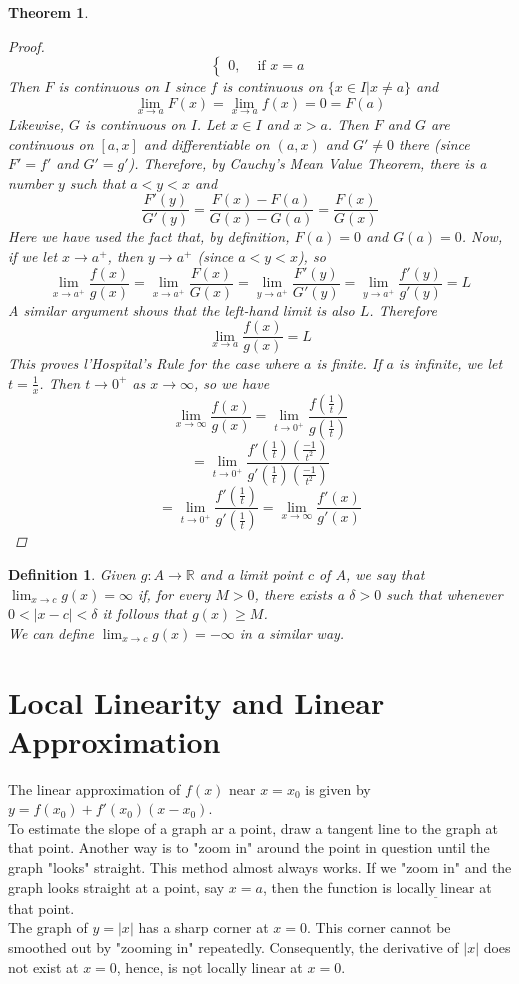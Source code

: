 \documentclass[10pt]{report}
\newtheorem{thm2}{Theorem}[section]
\newtheorem{def2}{Definition}[section]
\begin{document}
\begin{thm2}
\begin{proof}
$$\begin{cases}
0, & \text{ if } x=a
\end{cases}$$
Then $F$ is continuous on $I$ since $f$ is continuous on $\{x\in I|x\neq a\}$ and
$$\lim_{x\to a}F(x)=\lim_{x\to a}f(x)=0=F(a)$$
Likewise, $G$ is continuous on $I$. Let $x\in I$ and $x>a$. Then $F$ and $G$ are continuous on $[a,x]$ and differentiable on $(a,x)$ and $G'\neq 0$ there (since $F'=f'$ and $G' = g'$). Therefore, by Cauchy's Mean Value Theorem, there is a number $y$ such that $a<y<x$ and 
$$\frac{F'(y)}{G'(y)}=\frac{F(x)-F(a)}{G(x)-G(a)}=\frac{F(x)}{G(x)}$$
Here we have used the fact that, by definition, $F(a) =0$ and $G(a)=0$. Now, if we let $x\to a^+$, then $y\to a^+$ (since $a<y<x$), so
$$\lim_{x\to a^+}\frac{f(x)}{g(x)}=\lim_{x\to a^+}\frac{F(x)}{G(x)}=\lim_{y\to a^+}\frac{F'(y)}{G'(y)}=\lim_{y\to a^+}\frac{f'(y)}{g'(y)}=L$$
A similar argument shows that the left-hand limit is also $L$. Therefore
$$\lim_{x\to a}\frac{f(x)}{g(x)}=L$$
This proves l'Hospital's Rule for the case where $a$ is finite. If $a$ is infinite, we let $t=\frac{1}{x}$. Then $t\to 0^+$ as $x\to \infty$, so we have
$$\lim_{x\to \infty}\frac{f(x)}{g(x)}=\lim_{t\to 0^+}\frac{f(\frac{1}{t})}{g(\frac{1}{t})}$$
$$=\lim_{t\to 0^+}\frac{f'(\frac{1}{t})(\frac{-1}{t^2})}{g'(\frac{1}{t})(\frac{-1}{t^2})}$$
$$=\lim_{t\to 0^+}\frac{f'(\frac{1}{t})}{g'(\frac{1}{t})}=\lim_{x\to \infty}\frac{f'(x)}{g'(x)}$$
\end{proof}
\end{thm2}
\begin{def2}
Given $g:A\to\mathbb{R}$ and a limit point $c$ of $A$, we say that $\lim_{x\to c}g(x) = \infty$ if, for every $M>0$, there exists a $\delta >0$ such that whenever $0<|x-c|<\delta$ it follows that $g(x) \geq M$.\\We can define $\lim_{x\to c}g(x)=-\infty$ in a similar way.
\end{def2}
\section{Local Linearity and Linear Approximation}
The linear approximation of $f(x)$ near $x=x_0$ is given by $y=f(x_0)+f'(x_0)(x-x_0)$.\\
To estimate the slope of a graph ar a point, draw a tangent line to the graph at that point. Another way is to "zoom in" around the point in question until the graph "looks" straight. This method almost always works. If we "zoom in" and the graph looks straight at a point, say $x=a$, then the function is $\underline{\text{locally linear}}$ at that point.\\
The graph of $y=|x|$ has a sharp corner at $x=0$. This corner cannot be smoothed out by "zooming in" repeatedly. Consequently, the derivative of $|x|$ does not exist at $x=0$, hence, is $\underline{\text{not}}$ locally linear at $x=0$.
\end{document}
